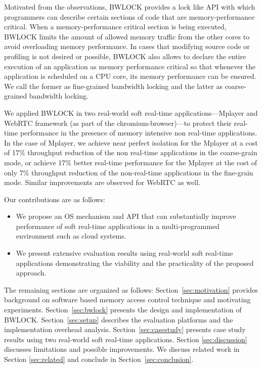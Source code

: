 \documentclass[times, 10pt,onecolumn]{article}
\begin{document}
Motivated from the observations, BWLOCK provides a lock like API with
which programmers can describe certain sections of code that are
memory-performance critical. When a memory-performance critical
section is being executed, BWLOCK limits the amount of allowed memory
traffic from the other cores to avoid overloading memory
performance. In cases that modifying source code or profiling is not
desired or possible, BWLOCK also allows to declare the entire execution
of an application as memory
performance critical so that whenever the application is scheduled on
a CPU core, its memory performance can be ensured.
We call the former as fine-grained bandwidth locking and the latter as
coarse-grained bandwidth locking.

We applied BWLOCK in two real-world soft real-time
applications---Mplayer and WebRTC framework (as part of the
chromium-browser)---to protect their real-time performance in the
presence of memory intensive non real-time applications. In the case of Mplayer,
we achieve near perfect isolation for the Mplayer at a cost of 17\%
throughput reduction of the non real-time applications in the
coarse-grain mode, or achieve 17\% better real-time performance for
the Mplayer at the cost of only 7\% throughput reduction of the
non-real-time applications in the fine-grain mode. Similar
improvements are observed for WebRTC as well.

Our contributions are as follows:
\begin{itemize}
\item We propose an OS mechanism and API that can substantially
improve performance of soft real-time applications in a
multi-programmed environment such as cloud systems.
\item We present extensive evaluation results using real-world soft
real-time applications demonstrating the viability and the
practicality of the proposed approach.
\end{itemize}

The remaining sections are organized as follows:
Section~\ref{sec:motivation} provides background on software based memory
access control technique and motivating experiments.
Section~\ref{sec:bwlock} presents the design and implementation of
BWLOCK. Section~\ref{sec:setup} describes the evaluation
platforms and the implementation overhead analysis.
Section~\ref{sec:casestudy} presents case study results using two
real-world soft real-time applications.
Section \ref{sec:discussion} discusses limitations and possible
improvements.
We discuss related work in Section \ref{sec:related} and conclude in
Section~\ref{sec:conclusion}.
\end{document}
